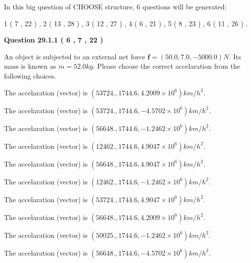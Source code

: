 \documentclass[12pt]{article}
\begin{document}
   
\vspace{0.2in}
   
 In this big question of CHOOSE structure,            6  questions will be generated: 
  
  
             1 (           7 ,          22 )
 ,
             2 (          13 ,          28 )
 ,
             3 (          12 ,          27 )
 ,
             4 (           6 ,          21 )
 ,
             5 (           8 ,          23 )
 ,
             6 (          11 ,          26 )
 .
  
\vspace{0.2in}
  
{\textbf{\Large{Question
29.1.1 
 (           6 ,           7 ,          22 )
}}}
  
  
 
An object is subjected to an external net force $\mathbf{f}=(
50.0 ,
7.0,
-5000.0  )N$. Its mass is known as
$m= %
52.0  kg$. Please choose the correct accelaration
from the following choices.
 
 
 
The accelaration (vector) is
$(
53724.,
1744.6 ,
4.2009 \times 10^{6}
)km/h^2.
$
 
 
The accelaration (vector) is
$(
53724.,
1744.6 ,
-4.5702 \times 10^{6}
)km/h^2.
$
 
 
The accelaration (vector) is
$(
56648.,
1744.6 ,
-1.2462 \times 10^{6}
)km/h^2.
$
 
 
The accelaration (vector) is
$(
12462.,
1744.6 ,
4.9047 \times 10^{6}
)km/h^2.
$
 
 
The accelaration (vector) is
$(
56648.,
1744.6 ,
4.9047 \times 10^{6}
)km/h^2.
$
 
 
The accelaration (vector) is
$(
12462.,
1744.6 ,
-1.2462 \times 10^{6}
)km/h^2.
$
 
 
The accelaration (vector) is
$(
53724.,
1744.6 ,
4.9047 \times 10^{6}
)km/h^2.
$
 
 
The accelaration (vector) is
$(
56648.,
1744.6 ,
4.2009 \times 10^{6}
)km/h^2.
$
 
 
The accelaration (vector) is
$(
50025.,
1744.6 ,
-1.2462 \times 10^{6}
)km/h^2.
$
 
 
The accelaration (vector) is
$(
56648.,
1744.6 ,
-4.5702 \times 10^{6}
)km/h^2.
$
 
\end{document}
